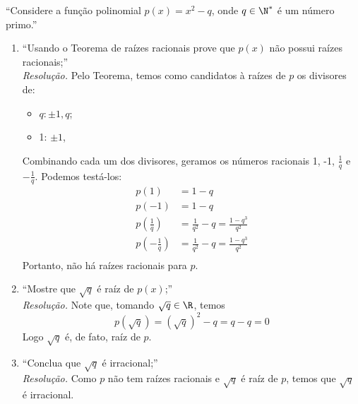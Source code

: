 \enquote{Considere a função polinomial $p(x) = x^2 - q$, onde $q \in \N^*$ é um número primo.}
\begin{enumerate}
    \item \enquote{Usando o Teorema de raízes racionais prove que $p(x)$ não possui raízes racionais;} \\
    \emph{Resolução.}
    Pelo Teorema, temos como candidatos à raízes de $p$ os divisores de:
    \begin{itemize}
        \item $q: \pm 1, q$;
        \item 1: $\pm 1$,
    \end{itemize}
    Combinando cada um dos divisores, geramos os números racionais 1, -1, $\frac{1}{q}$ e $-\frac{1}{q}$. Podemos testá-los:
    \begin{align*}
        p(1) &= 1 - q \\
        p(-1) &= 1 - q \\
        p(\frac{1}{q}) &= \frac{1}{q^2} - q = \frac{1 - q^3}{q^2} \\
        p(-\frac{1}{q}) &= \frac{1}{q^2} - q = \frac{1 - q^3}{q^2} \\
    \end{align*}
    Portanto, não há raízes racionais para $p$.
    \item \enquote{Mostre que $\sqrt{q}$ é raíz de $p(x)$;} \\
    \emph{Resolução.} Note que, tomando $\sqrt{q} \in \R$, temos 
    \begin{displaymath}
        p(\sqrt{q}) = (\sqrt{q})^2 - q = q - q = 0        
    \end{displaymath}
    Logo $\sqrt{q}$ é, de fato, raíz de $p$.
    \item \enquote{Conclua que $\sqrt{q}$ é irracional;} \\
    \emph{Resolução.} Como $p$ não tem raízes racionais e $\sqrt{q}$ é raíz de $p$, temos que $\sqrt{q}$ é irracional.
\end{enumerate}